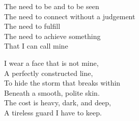 \begin{lyrics}
The need to be and to be seen\\
The need to connect without a judgement\\
The need to fulfill\\
The need to achieve something\\
That I can call mine

I wear a face that is not mine,\\
A perfectly constructed line,\\
To hide the storm that breaks within\\
Beneath a smooth, polite skin.\\
The cost is heavy, dark, and deep,\\
A tireless guard I have to keep.

\end{lyrics}

